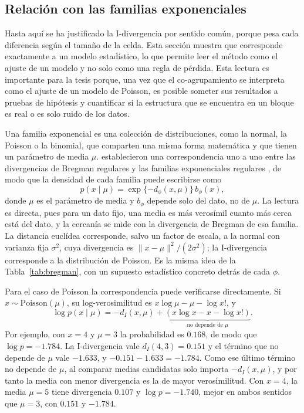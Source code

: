 \subsection{Relación con las familias exponenciales}\label{sec:bregman-expfam}

Hasta aquí se ha justificado la I-divergencia por sentido común, porque pesa cada
diferencia según el tamaño de la celda. Esta sección muestra que corresponde
exactamente a un modelo estadístico, lo que permite leer el método como el ajuste
de un modelo y no solo como una regla de pérdida. Esta lectura es importante para
la tesis porque, una vez que el co-agrupamiento se interpreta como el ajuste de
un modelo de Poisson, es posible someter sus resultados a pruebas de hipótesis y
cuantificar si la estructura que se encuentra en un bloque es real o es solo
ruido de los datos.

Una familia exponencial es una colección de distribuciones, como la normal, la
Poisson o la binomial, que comparten una misma forma matemática y que tienen un
parámetro de media $\mu$. \citet{Banerjee2005} establecieron una correspondencia
uno a uno entre las divergencias de Bregman regulares y las familias
exponenciales regulares \citep[Teoremas~4 y~6]{Banerjee2005}, de modo que la
densidad de cada familia puede escribirse como
\begin{equation}\label{eq:expfam}
  p(x \mid \mu) = \exp\{-d_\phi(x, \mu)\}\, b_\phi(x),
\end{equation}
donde $\mu$ es el parámetro de media y $b_\phi$ depende solo del dato, no de
$\mu$. La lectura es directa, pues para un dato fijo, una media es más verosímil
cuanto más cerca está del dato, y la cercanía se mide con la divergencia de Bregman de esa familia. La
distancia euclídea corresponde, salvo un factor de escala, a la normal con
varianza fija $\sigma^2$, cuya divergencia es
$\lVert x - \mu \rVert^2 / (2\sigma^2)$; la I-divergencia corresponde a la
distribución de Poisson. Es la misma idea de la Tabla~\ref{tab:bregman}, con un
supuesto estadístico concreto detrás de cada $\phi$.

Para el caso de Poisson la correspondencia puede verificarse directamente. Si
$x \sim \mathrm{Poisson}(\mu)$, su log-verosimilitud es
$x \log \mu - \mu - \log x!$, y
\begin{equation}\label{eq:poisson-idiv}
  \log p(x \mid \mu) = -d_I(x, \mu) + \underbrace{\left( x \log x - x - \log x! \right)}_{\text{no depende de } \mu}.
\end{equation}
Por ejemplo, con $x = 4$ y $\mu = 3$ la probabilidad es $0.168$, de modo que
$\log p = -1.784$. La I-divergencia vale $d_I(4, 3) = 0.151$ y el término que no
depende de $\mu$ vale $-1.633$, y $-0.151 - 1.633 = -1.784$. Como ese último
término no depende de $\mu$, al comparar medias candidatas solo importa
$-d_I(x, \mu)$, y por tanto la media con menor divergencia es la de mayor verosimilitud. Con
$x = 4$, la media $\mu = 5$ tiene divergencia $0.107$ y $\log p = -1.740$,
mejor en ambos sentidos que $\mu = 3$, con $0.151$ y $-1.784$.

